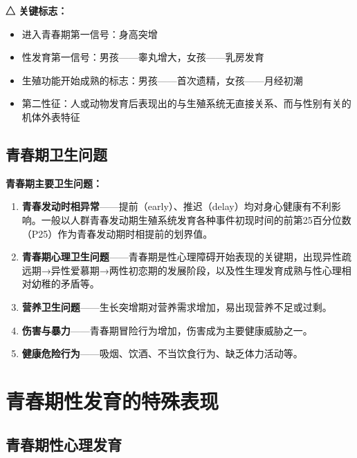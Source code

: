 \begin{exambox}
\textbf{△ 关键标志：}
\begin{itemize}
    \item 进入青春期第一信号：身高突增
    \item 性发育第一信号：男孩——睾丸增大，女孩——乳房发育
    \item 生殖功能开始成熟的标志：男孩——首次遗精，女孩——月经初潮
    \item 第二性征：人或动物发育后表现出的与生殖系统无直接关系、而与性别有关的机体外表特征
\end{itemize}
\end{exambox}

\subsection{青春期卫生问题}

\begin{tipbox}
\textbf{青春期主要卫生问题：}

\begin{enumerate}[leftmargin=*]
    \item \textbf{青春发动时相异常}——提前（early）、推迟（delay）均对身心健康有不利影响。一般以人群青春发动期生殖系统发育各种事件初现时间的前第25百分位数（P25）作为青春发动期时相提前的划界值。
    \item \textbf{青春期心理卫生问题}——青春期是性心理障碍开始表现的关键期，出现异性疏远期→异性爱慕期→两性初恋期的发展阶段，以及性生理发育成熟与性心理相对幼稚的矛盾等。
    \item \textbf{营养卫生问题}——生长突增期对营养需求增加，易出现营养不足或过剩。
    \item \textbf{伤害与暴力}——青春期冒险行为增加，伤害成为主要健康威胁之一。
    \item \textbf{健康危险行为}——吸烟、饮酒、不当饮食行为、缺乏体力活动等。
\end{enumerate}
\end{tipbox}

\section{青春期性发育的特殊表现}

\subsection{青春期性心理发育}

